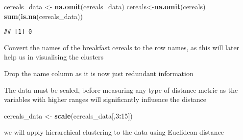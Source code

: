 \documentclass[
]{article}
\newenvironment{Shaded}{\begin{snugshade}}{\end{snugshade}}
\newcommand{\DecValTok}[1]{\textcolor[rgb]{0.00,0.00,0.81}{#1}}
\newcommand{\KeywordTok}[1]{\textcolor[rgb]{0.13,0.29,0.53}{\textbf{#1}}}
\newcommand{\NormalTok}[1]{#1}
\newcommand{\OperatorTok}[1]{\textcolor[rgb]{0.81,0.36,0.00}{\textbf{#1}}}
\newcommand{\OtherTok}[1]{\textcolor[rgb]{0.56,0.35,0.01}{#1}}
\newcommand{\StringTok}[1]{\textcolor[rgb]{0.31,0.60,0.02}{#1}}
\begin{document}
\begin{Shaded}
\begin{Highlighting}[]
\NormalTok{cereals_data <-}\StringTok{ }\KeywordTok{na.omit}\NormalTok{(cereals_data)}
\NormalTok{cereals<-}\KeywordTok{na.omit}\NormalTok{(cereals)}
\KeywordTok{sum}\NormalTok{(}\KeywordTok{is.na}\NormalTok{(cereals_data))}
\end{Highlighting}
\end{Shaded}

\begin{verbatim}
## [1] 0
\end{verbatim}

Convert the names of the breakfast cereals to the row names, as this
will later help us in visualising the clusters

\begin{Shaded}
\end{Shaded}

Drop the name column as it is now just redundant information

\begin{Shaded}
\end{Shaded}

The data must be scaled, before measuring any type of distance metric as
the variables with higher ranges will significantly influence the
distance

\begin{Shaded}
\begin{Highlighting}[]
\NormalTok{cereals_data <-}\StringTok{ }\KeywordTok{scale}\NormalTok{(cereals_data[,}\DecValTok{3}\OperatorTok{:}\DecValTok{15}\NormalTok{])}
\end{Highlighting}
\end{Shaded}

we will apply hierarchical clustering to the data using Euclidean
distance
\end{document}
